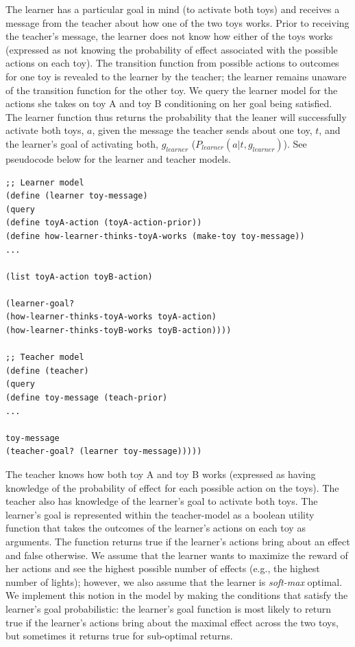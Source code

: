 \documentclass[10pt,letterpaper]{article}
\begin{document}
The learner has a particular goal in mind (to activate both toys) and receives a message from the teacher about how one of the two toys works. Prior to receiving the teacher's message, the learner does not know how either of the toys works (expressed as not knowing the probability of effect associated with the possible actions on each toy). The transition function from possible actions to outcomes for one toy is revealed to the learner by the teacher; the learner remains unaware of the transition function for the other toy. We query the learner model for the actions she takes on toy A and toy B conditioning on her goal being satisfied. The learner function thus returns the probability that the leaner will successfully activate both toys, $a$, given the message the teacher sends about one toy, $t$, and the learner's goal of activating both, $g_{learner}$ ($P_{learner}(a | t, g_{learner})$). See pseudocode below for the learner and teacher models.

\begin{lstlisting}
;; Learner model
(define (learner toy-message)
(query
(define toyA-action (toyA-action-prior))
(define how-learner-thinks-toyA-works (make-toy toy-message))
...

(list toyA-action toyB-action) 

(learner-goal? 			
(how-learner-thinks-toyA-works toyA-action) 
(how-learner-thinks-toyB-works toyB-action))))

;; Teacher model
(define (teacher)
(query
(define toy-message (teach-prior)
...

toy-message 
(teacher-goal? (learner toy-message))))) 
\end{lstlisting}

The teacher knows how both toy A and toy B works (expressed as having knowledge of the probability of effect for each possible action on the toys). 
The teacher also has knowledge of the learner's goal to activate both toys. 
The learner's goal is represented within the teacher-model as a boolean utility function that takes the outcomes of the learner's actions on each toy as arguments. 
The function returns true if the learner's actions bring about an effect and false otherwise. 
We assume that the learner wants to maximize the reward of her actions and see the highest possible number of effects (e.g., the highest number of lights); however, we also assume that the learner is \textit{soft-max} optimal. 
We implement this notion in the model by making the conditions that satisfy the learner's goal probabilistic: the learner's goal function is most likely to return true if the learner's actions bring about the maximal effect across the two toys, but sometimes it returns true for sub-optimal returns. 
\end{document}
